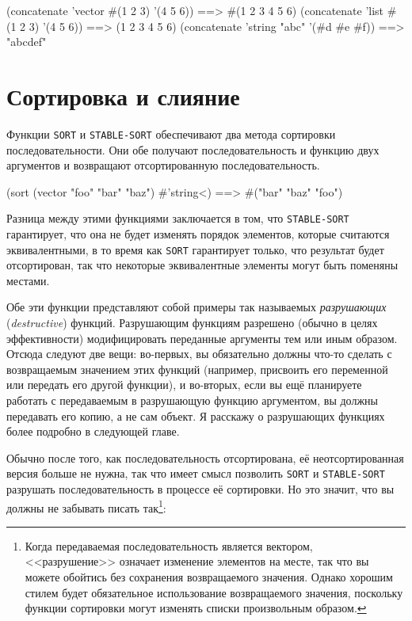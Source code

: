 \begin{myverb}
(concatenate 'vector #(1 2 3) '(4 5 6))    ==> #(1 2 3 4 5 6)
(concatenate 'list #(1 2 3) '(4 5 6))      ==> (1 2 3 4 5 6)
(concatenate 'string "abc" '(#\bslash{}d #\bslash{}e #\bslash{}f)) ==> "abcdef"
\end{myverb}

\section{Сортировка и слияние}

Функции \lstinline{SORT} и \lstinline{STABLE-SORT} обеспечивают два метода сортировки
последовательности.  Они обе получают последовательность и функцию двух аргументов и
возвращают отсортированную последовательность.

\begin{myverb}
(sort (vector "foo" "bar" "baz") #'string<) ==> #("bar" "baz" "foo")
\end{myverb}

Разница между этими функциями заключается в том, что \lstinline{STABLE-SORT} гарантирует, что
она не будет изменять порядок элементов, которые считаются эквивалентными, в то время как
\lstinline{SORT} гарантирует только, что результат будет отсортирован, так что некоторые
эквивалентные элементы могут быть поменяны местами.

Обе эти функции представляют собой примеры так называемых \textit{разрушающих} (\textit{destructive}) функций.  Разрушающим
функциям разрешено (обычно в целях эффективности) модифицировать переданные аргументы тем
или иным образом.  Отсюда следуют две вещи: во-первых, вы обязательно должны что-то сделать с
возвращаемым значением этих функций (например, присвоить его переменной или передать его
другой функции), и во-вторых, если вы ещё планируете работать с передаваемым в
разрушающую функцию аргументом, вы должны передавать его копию, а не сам объект.
Я расскажу о разрушающих функциях более подробно в следующей главе.

Обычно после того, как последовательность отсортирована, её неотсортированная версия
больше не нужна, так что имеет смысл
позволить \lstinline{SORT} и \lstinline{STABLE-SORT} разрушать последовательность в процессе её
сортировки.  Но это значит, что вы должны не забывать писать так\footnote{Когда
  передаваемая последовательность является вектором, <<разрушение>> означает изменение
  элементов на месте, так что вы можете обойтись без сохранения возвращаемого значения.
  Однако хорошим стилем будет обязательное использование возвращаемого значения,
  поскольку функции сортировки могут изменять списки произвольным образом.}:

